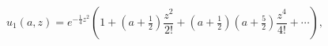 \[u_{1}(a,z)=e^{-\tfrac{1}{4}z^{2}}\left(1+(a+\tfrac{1}{2})\frac{z^{2}}{2!}+(a+%
\tfrac{1}{2})(a+\tfrac{5}{2})\frac{z^{4}}{4!}+\cdots\right),\]